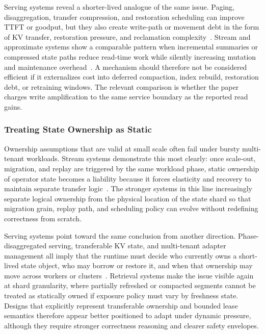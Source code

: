 \documentclass[acmsmall,screen,review]{acmart}
\begin{document}
Serving systems reveal a shorter-lived analogue of the same issue. Paging, disaggregation, transfer compression, and restoration scheduling can improve TTFT or goodput, but they also create write-path or movement debt in the form of KV transfer, restoration pressure, and reclamation complexity~\cite{kwon2023pagedattention,patel2024splitwise,guo2026splitzip,nian2026cacheflow}. Stream and approximate systems show a comparable pattern when incremental summaries or compressed state paths reduce read-time work while silently increasing mutation and maintenance overhead~\cite{zeng2024cstream,zeng2024pecj}. A mechanism should therefore not be considered efficient if it externalizes cost into deferred compaction, index rebuild, restoration debt, or retraining windows. The relevant comparison is whether the paper charges write amplification to the same service boundary as the reported read gains.

\subsubsection{Treating State Ownership as Static}

Ownership assumptions that are valid at small scale often fail under bursty multi-tenant workloads. Stream systems demonstrate this most clearly: once scale-out, migration, and replay are triggered by the same workload phase, static ownership of operator state becomes a liability because it forces elasticity and recovery to maintain separate transfer logic~\cite{fernandez2013osm,nasir2019megaphone,mao2025spacker}. The stronger systems in this line increasingly separate logical ownership from the physical location of the state shard so that migration grain, replay path, and scheduling policy can evolve without redefining correctness from scratch.

Serving systems point toward the same conclusion from another direction. Phase-disaggregated serving, transferable KV state, and multi-tenant adapter management all imply that the runtime must decide who currently owns a short-lived state object, who may borrow or restore it, and when that ownership may move across workers or clusters~\cite{zhong2024distserve,patel2024splitwise,qin2026prfaas,chen2024punica}. Retrieval systems make the issue visible again at shard granularity, where partially refreshed or compacted segments cannot be treated as statically owned if exposure policy must vary by freshness state. Designs that explicitly represent transferable ownership and bounded lease semantics therefore appear better positioned to adapt under dynamic pressure, although they require stronger correctness reasoning and clearer safety envelopes.
\end{document}
